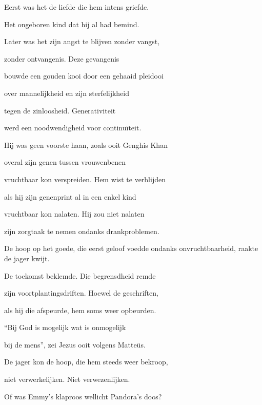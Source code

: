 Eerst was het de liefde
die hem intens griefde.

Het ongeboren kind
dat hij al had bemind.

Later was het zijn angst
te blijven zonder vangst,

zonder ontvangenis.
Deze gevangenis

bouwde een gouden kooi
door een gehaaid pleidooi

over mannelijkheid
en zijn sterfelijkheid

tegen de zinloosheid.
Generativiteit

werd een noodwendigheid
voor continuïteit.

Hij was geen voorste haan,
zoals ooit Genghis Khan

overal zijn genen
tussen vrouwenbenen

vruchtbaar kon verspreiden.
Hem wist te verblijden

als hij zijn genenprint
al in een enkel kind

vruchtbaar kon nalaten.
Hij zou niet nalaten

zijn zorgtaak te nemen
ondanks
drankproblemen.

De hoop op het goede,
die eerst geloof voedde
ondanks onvruchtbaarheid,
raakte de jager kwijt.

De toekomst beklemde.
Die begrensdheid remde

zijn voortplantingsdriften.
Hoewel de geschriften,

als hij die afspeurde,
hem soms weer opbeurden.

“Bij God is mogelijk
wat is onmogelijk

bij de mens”, zei Jezus
ooit volgens Matteüs.

De jager kon de hoop,
die hem steeds weer bekroop,

niet verwerkelijken.
Niet verwezenlijken.

Of was Emmy’s klaproos
wellicht Pandora’s doos?
